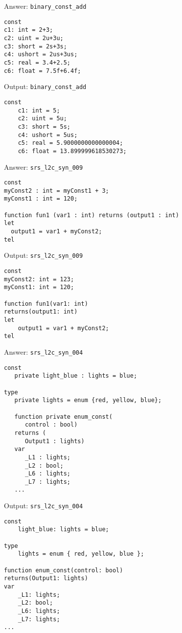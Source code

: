 \documentclass{beamer}
\begin{document}
\begin{frame}[fragile]{Answer: \texttt{binary\_const\_add}}
    \begin{lstlisting}
const
c1: int = 2+3;
c2: uint = 2u+3u;
c3: short = 2s+3s;
c4: ushort = 2us+3us;
c5: real = 3.4+2.5;
c6: float = 7.5f+6.4f;
    \end{lstlisting}
\end{frame}

\begin{frame}[fragile]{Output: \texttt{binary\_const\_add}}
    \begin{lstlisting}
const
    c1: int = 5;
    c2: uint = 5u;
    c3: short = 5s;
    c4: ushort = 5us;
    c5: real = 5.9000000000000004;
    c6: float = 13.899999618530273;
    \end{lstlisting}
\end{frame}

\begin{frame}[fragile]{Answer: \texttt{srs\_l2c\_syn\_009}}
    \begin{lstlisting}
const
myConst2 : int = myConst1 + 3;
myConst1 : int = 120;

function fun1 (var1 : int) returns (output1 : int)
let
  output1 = var1 + myConst2;
tel
    \end{lstlisting}
\end{frame}

\begin{frame}[fragile]{Output: \texttt{srs\_l2c\_syn\_009}}
    \begin{lstlisting}
const
myConst2: int = 123;
myConst1: int = 120;

function fun1(var1: int)
returns(output1: int)
let
    output1 = var1 + myConst2;
tel
    \end{lstlisting}
\end{frame}

\begin{frame}[fragile]{Answer: \texttt{srs\_l2c\_syn\_004}}
    \begin{lstlisting}
const
   private light_blue : lights = blue;

type
   private lights = enum {red, yellow, blue};

   function private enum_const(
      control : bool)
   returns (
      Output1 : lights)
   var
      _L1 : lights;
      _L2 : bool;
      _L6 : lights;
      _L7 : lights;
   ...
    \end{lstlisting}
\end{frame}

\begin{frame}[fragile]{Output: \texttt{srs\_l2c\_syn\_004}}
    \begin{lstlisting}
const
    light_blue: lights = blue;

type
    lights = enum { red, yellow, blue };

function enum_const(control: bool)
returns(Output1: lights)
var
    _L1: lights;
    _L2: bool;
    _L6: lights;
    _L7: lights;
...
    \end{lstlisting}
\end{frame}
\end{document}
